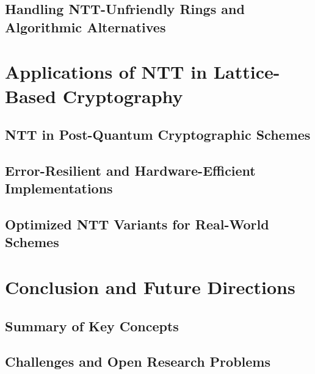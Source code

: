 \documentclass[12pt]{article}
\begin{document}
\subsection{Handling NTT-Unfriendly Rings and Algorithmic Alternatives}

\section{Applications of NTT in Lattice-Based Cryptography}

\subsection{NTT in Post-Quantum Cryptographic Schemes}

\subsection{Error-Resilient and Hardware-Efficient Implementations}

\subsection{Optimized NTT Variants for Real-World Schemes}

\section{Conclusion and Future Directions}

\subsection{Summary of Key Concepts}

\subsection{Challenges and Open Research Problems}







 
\end{document}
